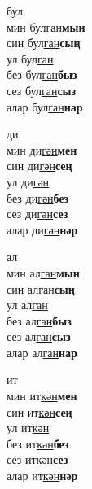\begin{multicols}{4}
\begin{enumerate}
\begin{minipage}{\linewidth}
    \item
    бул\\
    мин бул\underline{ган}\textbf{мын}\\
    син бул\underline{ган}\textbf{сың}\\
    ул бул\underline{ган}\\
    без бул\underline{ган}\textbf{быз}\\
    сез бул\underline{ган}\textbf{сыз}\\
    алар бул\underline{ган}\textbf{нар}\\
\end{minipage}

\begin{minipage}{\linewidth}
    \item
    ди\\
    мин ди\underline{гән}\textbf{мен}\\
    син ди\underline{гән}\textbf{сең}\\
    ул ди\underline{гән}\\
    без ди\underline{гән}\textbf{без}\\
    сез ди\underline{гән}\textbf{сез}\\
    алар ди\underline{гән}\textbf{нәр}\\
\end{minipage}

\begin{minipage}{\linewidth}
    \item
    ал\\
    мин ал\underline{ган}\textbf{мын}\\
    син ал\underline{ган}\textbf{сың}\\
    ул ал\underline{ган}\\
    без ал\underline{ган}\textbf{быз}\\
    сез ал\underline{ган}\textbf{сыз}\\
    алар ал\underline{ган}\textbf{нар}\\
\end{minipage}

\begin{minipage}{\linewidth}
    \item
    ит\\
    мин ит\underline{кән}\textbf{мен}\\
    син ит\underline{кән}\textbf{сең}\\
    ул ит\underline{кән}\\
    без ит\underline{кән}\textbf{без}\\
    сез ит\underline{кән}\textbf{сез}\\
    алар ит\underline{кән}\textbf{нәр}\\
\end{minipage}


\end{enumerate}
\end{multicols}
